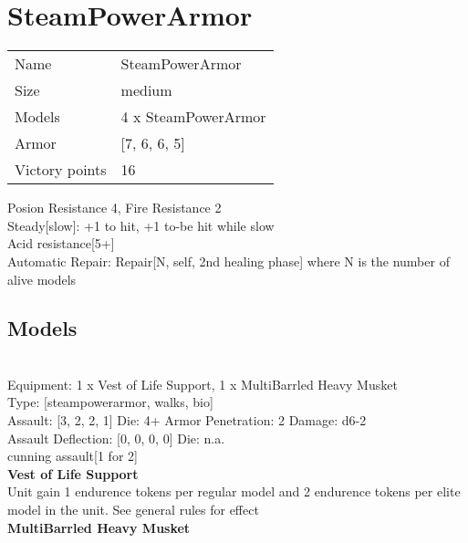 \pagebreak

\section{ SteamPowerArmor }

\begin{tabular}{ll}
  Name & SteamPowerArmor \\
  Size & medium\\
  Models & 4 x SteamPowerArmor\\
  Armor & [7, 6, 6, 5]\\
  Victory points & 16\\
\end{tabular}

Posion Resistance 4, Fire Resistance 2\\ 
Steady[slow]: +1 to hit, +1 to-be hit while slow\\ 
Acid resistance[5+]\\ 
Automatic Repair: Repair[N, self, 2nd healing phase] where N is the number of alive models\\ 


\subsection{ Models }

 \\
Equipment: 1 x Vest of Life Support, 1 x MultiBarrled Heavy Musket \\
Type: [steampowerarmor, walks, bio] \\

Assault: [3, 2, 2, 1] Die: 4+ Armor Penetration: 2 Damage: d6-2 \\
Assault Deflection: [0, 0, 0, 0] Die: n.a.\\
\indent cunning assault[1 for 2]\\ 
 



{\bf Vest of Life Support } \\

Unit gain 1 endurence tokens per regular model  and 2 endurence tokens per elite model in the unit. See general rules for effect\\ 





{\bf MultiBarrled Heavy Musket } \\



